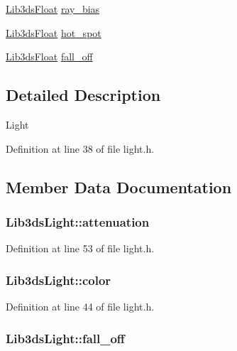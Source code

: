 \begin{DoxyCompactItemize}
\item 
\hyperlink{types_8h_ab18e70f51f9a53c9dee8d930c8e1a7bf}{Lib3ds\-Float} \hyperlink{struct_lib3ds_light_adc313b1c6a1ded43dc4bfe942234b54c}{ray\-\_\-bias}
\item 
\hyperlink{types_8h_ab18e70f51f9a53c9dee8d930c8e1a7bf}{Lib3ds\-Float} \hyperlink{struct_lib3ds_light_a9d320ad74d298f5181f49f3f40e137c6}{hot\-\_\-spot}
\item 
\hyperlink{types_8h_ab18e70f51f9a53c9dee8d930c8e1a7bf}{Lib3ds\-Float} \hyperlink{struct_lib3ds_light_ac71a34ab9c1d17cc02ae597a4e29c537}{fall\-\_\-off}
\end{DoxyCompactItemize}


\subsection{Detailed Description}
Light 

Definition at line 38 of file light.\-h.



\subsection{Member Data Documentation}
\hypertarget{struct_lib3ds_light_af75ae14269a64dffae9d1a863938da35}{
\subsubsection[{attenuation}]{ Lib3ds\-Light\-::attenuation}}\label{struct_lib3ds_light_af75ae14269a64dffae9d1a863938da35}


Definition at line 53 of file light.\-h.

\hypertarget{struct_lib3ds_light_a52ce126f4d863e63ebbf073e704e532b}{
\subsubsection[{color}]{ Lib3ds\-Light\-::color}}\label{struct_lib3ds_light_a52ce126f4d863e63ebbf073e704e532b}


Definition at line 44 of file light.\-h.

\hypertarget{struct_lib3ds_light_ac71a34ab9c1d17cc02ae597a4e29c537}{
\subsubsection[{fall\-\_\-off}]{ Lib3ds\-Light\-::fall\-\_\-off}}\label{struct_lib3ds_light_ac71a34ab9c1d17cc02ae597a4e29c537}



